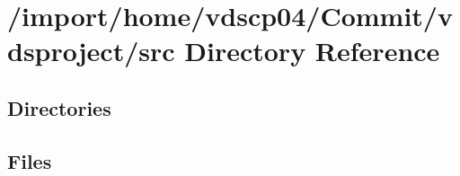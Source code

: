 \section{/import/home/vdscp04/\+Commit/vdsproject/src Directory Reference}
\label{dir_68267d1309a1af8e8297ef4c3efbcdba}
\subsection*{Directories}
\begin{DoxyCompactItemize}
\end{DoxyCompactItemize}
\subsection*{Files}
\begin{DoxyCompactItemize}
\end{DoxyCompactItemize}
